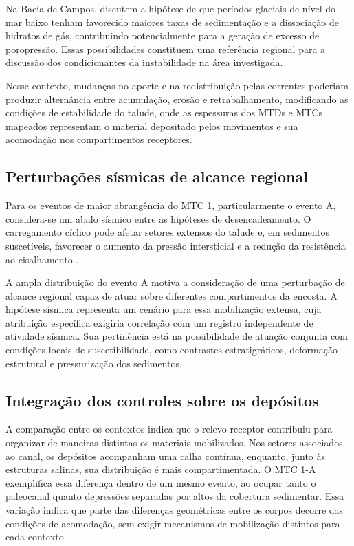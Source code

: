 Na Bacia de Campos,  discutem a hipótese de que períodos glaciais de nível do mar baixo tenham favorecido maiores taxas de sedimentação e a dissociação de hidratos de gás, contribuindo potencialmente para a geração de excesso de poropressão. Essas possibilidades constituem uma referência regional para a discussão dos condicionantes da instabilidade na área investigada.

Nesse contexto, mudanças no aporte e na redistribuição pelas correntes poderiam produzir alternância entre acumulação, erosão e retrabalhamento, modificando as condições de estabilidade do talude, onde as espessuras dos MTDs e MTCs mapeados representam o material depositado pelos movimentos e sua acomodação nos compartimentos receptores.

\subsection{Perturbações sísmicas de alcance regional}\label{sec:6-7-3}

Para os eventos de maior abrangência do MTC 1, particularmente o evento A, considera-se um abalo sísmico entre as hipóteses de desencadeamento. O carregamento cíclico pode afetar setores extensos do talude e, em sedimentos suscetíveis, favorecer o aumento da pressão intersticial e a redução da resistência ao cisalhamento \cite{hampton1996,talling2014}.

A ampla distribuição do evento A motiva a consideração de uma perturbação de alcance regional capaz de atuar sobre diferentes compartimentos da encosta. A hipótese sísmica representa um cenário para essa mobilização extensa, cuja atribuição específica exigiria correlação com um registro independente de atividade sísmica. Sua pertinência está na possibilidade de atuação conjunta com condições locais de suscetibilidade, como contrastes estratigráficos, deformação estrutural e pressurização dos sedimentos.

\subsection{Integração dos controles sobre os depósitos}\label{sec:6-7-4}

A comparação entre os contextos indica que o relevo receptor contribuiu para organizar de maneiras distintas os materiais mobilizados. Nos setores associados ao canal, os depósitos acompanham uma calha contínua, enquanto, junto às estruturas salinas, sua distribuição é mais compartimentada. O MTC 1-A exemplifica essa diferença dentro de um mesmo evento, ao ocupar tanto o paleocanal quanto depressões separadas por altos da cobertura sedimentar. Essa variação indica que parte das diferenças geométricas entre os corpos decorre das condições de acomodação, sem exigir mecanismos de mobilização distintos para cada contexto.

